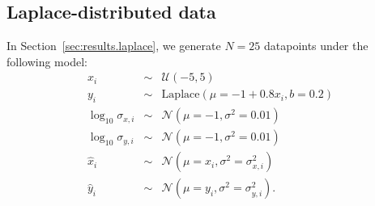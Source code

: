 \documentclass[fleqn,usenatbib]{rasti}
\begin{document}
\subsection{Laplace-distributed data}
\label{sec:data-models.laplace}

In Section~\ref{sec:results.laplace}, we generate $N = 25$ datapoints under the
following model:
\begin{eqnarray}
    x_i &\sim& \mathcal U (-5, 5) \\
    y_i &\sim& \mathrm{Laplace} (\mu = -1 + 0.8 x_i, b = 0.2) \\
    \log_{10} \sigma_{x, i} &\sim& \mathcal N (\mu = -1, \sigma^2 = 0.01) \\
    \log_{10} \sigma_{y, i} &\sim& \mathcal N (\mu = -1, \sigma^2 = 0.01) \\
    \hat{x}_i &\sim& \mathcal N (\mu = x_i, \sigma^2 = \sigma_{x, i}^2) \\
    \hat{y}_i &\sim& \mathcal N (\mu = y_i, \sigma^2 = \sigma_{y, i}^2).
\end{eqnarray}






\bsp	%
\label{lastpage}
\end{document}
